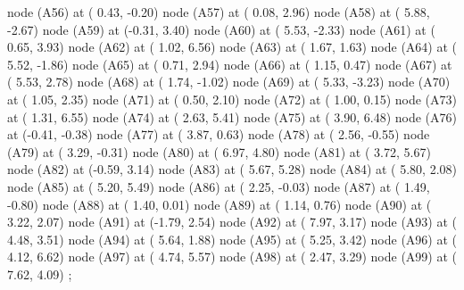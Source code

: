 \documentclass[ngerman]{beamer}
\begin{document}
{\begin{scope}[every node/.style={coordinate},scale=.4]
{      node (A56) at ( 0.43, -0.20) {}
      node (A57) at ( 0.08,  2.96) {}
      node (A58) at ( 5.88, -2.67) {}
      node (A59) at (-0.31,  3.40) {}
      node (A60) at ( 5.53, -2.33) {}
      node (A61) at ( 0.65,  3.93) {}
      node (A62) at ( 1.02,  6.56) {}
      node (A63) at ( 1.67,  1.63) {}
      node (A64) at ( 5.52, -1.86) {}
      node (A65) at ( 0.71,  2.94) {}
      node (A66) at ( 1.15,  0.47) {}
      node (A67) at ( 5.53,  2.78) {}
      node (A68) at ( 1.74, -1.02) {}
      node (A69) at ( 5.33, -3.23) {}
      node (A70) at ( 1.05,  2.35) {}
      node (A71) at ( 0.50,  2.10) {}
      node (A72) at ( 1.00,  0.15) {}
      node (A73) at ( 1.31,  6.55) {}
      node (A74) at ( 2.63,  5.41) {}
      node (A75) at ( 3.90,  6.48) {}
      node (A76) at (-0.41, -0.38) {}
      node (A77) at ( 3.87,  0.63) {}
      node (A78) at ( 2.56, -0.55) {}
      node (A79) at ( 3.29, -0.31) {}
      node (A80) at ( 6.97,  4.80) {}
      node (A81) at ( 3.72,  5.67) {}
      node (A82) at (-0.59,  3.14) {}
      node (A83) at ( 5.67,  5.28) {}
      node (A84) at ( 5.80,  2.08) {}
      node (A85) at ( 5.20,  5.49) {}
      node (A86) at ( 2.25, -0.03) {}
      node (A87) at ( 1.49, -0.80) {}
      node (A88) at ( 1.40,  0.01) {}
      node (A89) at ( 1.14,  0.76) {}
      node (A90) at ( 3.22,  2.07) {}
      node (A91) at (-1.79,  2.54) {}
      node (A92) at ( 7.97,  3.17) {}
      node (A93) at ( 4.48,  3.51) {}
      node (A94) at ( 5.64,  1.88) {}
      node (A95) at ( 5.25,  3.42) {}
      node (A96) at ( 4.12,  6.62) {}
      node (A97) at ( 4.74,  5.57) {}
      node (A98) at ( 2.47,  3.29) {}
      node (A99) at ( 7.62,  4.09) {}
    };


\end{scope}}
\end{document}
